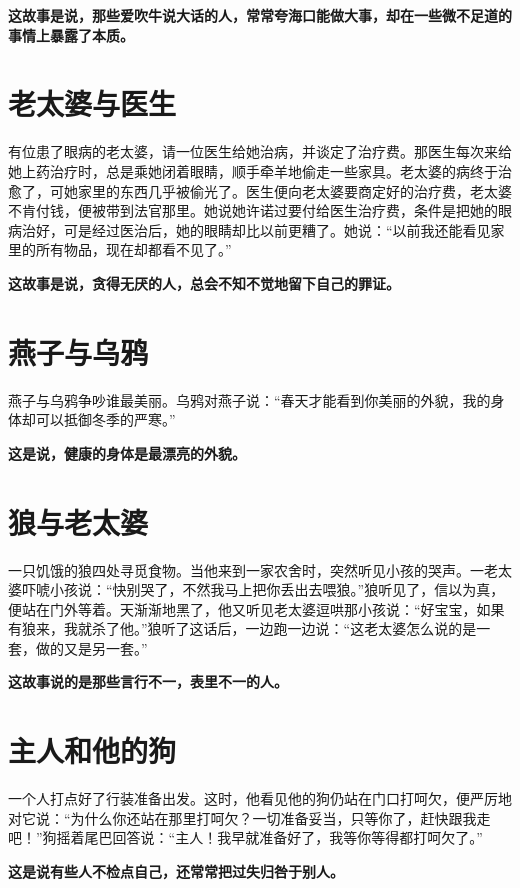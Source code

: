 {\bfseries \color{red}这故事是说，那些爱吹牛说大话的人，常常夸海口能做大事，却在一些微不足道的事情上暴露了本质。}

\section{老太婆与医生}

有位患了眼病的老太婆，请一位医生给她治病，并谈定了治疗费。那医生每次来给她上药治疗时，总是乘她闭着眼睛，顺手牵羊地偷走一些家具。老太婆的病终于治愈了，可她家里的东西几乎被偷光了。医生便向老太婆要商定好的治疗费，老太婆不肯付钱，便被带到法官那里。她说她许诺过要付给医生治疗费，条件是把她的眼病治好，可是经过医治后，她的眼睛却比以前更糟了。她说：“以前我还能看见家里的所有物品，现在却都看不见了。”

{\bfseries \color{red}这故事是说，贪得无厌的人，总会不知不觉地留下自己的罪证。}

\section{燕子与乌鸦}

燕子与乌鸦争吵谁最美丽。乌鸦对燕子说：“春天才能看到你美丽的外貌，我的身体却可以抵御冬季的严寒。”

{\bfseries \color{red}这是说，健康的身体是最漂亮的外貌。}

\section{狼与老太婆}

一只饥饿的狼四处寻觅食物。当他来到一家农舍时，突然听见小孩的哭声。一老太婆吓唬小孩说：“快别哭了，不然我马上把你丢出去喂狼。”狼听见了，信以为真，便站在门外等着。天渐渐地黑了，他又听见老太婆逗哄那小孩说：“好宝宝，如果有狼来，我就杀了他。”狼听了这话后，一边跑一边说：“这老太婆怎么说的是一套，做的又是另一套。”

{\bfseries \color{red}这故事说的是那些言行不一，表里不一的人。}

\section{主人和他的狗}

一个人打点好了行装准备出发。这时，他看见他的狗仍站在门口打呵欠，便严厉地对它说：“为什么你还站在那里打呵欠？一切准备妥当，只等你了，赶快跟我走吧！”狗摇着尾巴回答说：“主人！我早就准备好了，我等你等得都打呵欠了。”

{\bfseries \color{red}这是说有些人不检点自己，还常常把过失归咎于别人。}


